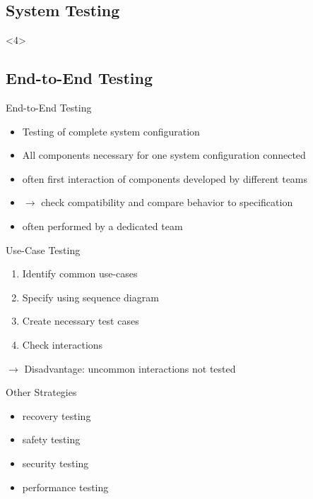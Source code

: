 \subsection{System Testing}
\begin{frame}<4>{\insertsubsection}
	\slideStagesTesting
\end{frame}

\subsection{End-to-End Testing}
\begin{frame}{\insertsubsection}
	\begin{fancycolumns}[animation=none]
		\begin{definition}{End-to-End Testing}
			\begin{itemize}
				\item Testing of complete system configuration
				\item All components necessary for one system configuration connected
				\item often first interaction of components developed by different teams
				\item $\rightarrow$ check compatibility and compare behavior to specification
				\item often performed by a dedicated team
			\end{itemize}
		\end{definition}\pause
		\nextcolumn
		\begin{definition}{Use-Case Testing}
			\begin{enumerate}
				\item Identify common use-cases
				\item Specify using sequence diagram
				\item Create necessary test cases
				\item Check interactions
			\end{enumerate}
			$\rightarrow$ Disadvantage: uncommon interactions not tested
		\end{definition}\pause
		\begin{note}{Other Strategies}
			\begin{itemize}
				\item recovery testing
				\item safety testing
				\item security testing
				\item performance testing
			\end{itemize}
		\end{note}
	\end{fancycolumns}
\end{frame}

